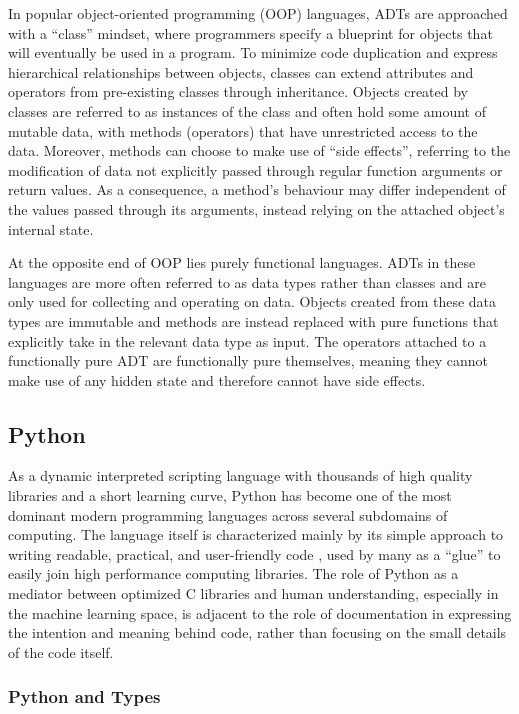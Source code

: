 \documentclass{article}
\begin{document}
In popular object-oriented programming (OOP) languages,
ADTs are approached with a ``class'' mindset, where programmers specify a blueprint for objects that
will eventually be used in a program. To minimize code duplication
and express hierarchical relationships between objects,
classes can extend attributes and operators from pre-existing classes through inheritance.
Objects created by classes are referred to as instances of the class and often hold
some amount of mutable data, with methods (operators) that have unrestricted access to the data. Moreover, methods can choose to make use of
``side effects'', referring to the modification of data not explicitly passed through
regular function arguments or return values. As a consequence, a method's behaviour may differ
independent of the values passed through its arguments, instead relying on the attached object's internal state.

At the opposite end of OOP lies purely functional languages. ADTs in these languages
are more often referred to as data types rather than classes and are only used for collecting and operating on data.
Objects created from these data types are immutable and methods are instead replaced with pure functions that
explicitly take in the relevant data type as input. The operators attached to a functionally pure ADT are functionally
pure themselves, meaning they cannot make use of any hidden state and therefore cannot have side effects.

\subsection{Python}

As a dynamic interpreted scripting language with thousands of high quality libraries and a short learning curve,
Python has become one of the most dominant modern programming languages across several subdomains of computing.
The language itself is characterized mainly by its simple approach to writing readable, practical, and user-friendly code \cite{pythonZen},
used by many as a ``glue'' to easily join high performance computing libraries. The role of Python as a mediator
between optimized C libraries and human understanding, especially in the machine learning space, is adjacent to the role
of documentation in expressing the intention and meaning behind code,
rather than focusing on the small details of the code itself.

\subsubsection{Python and Types}
\end{document}
